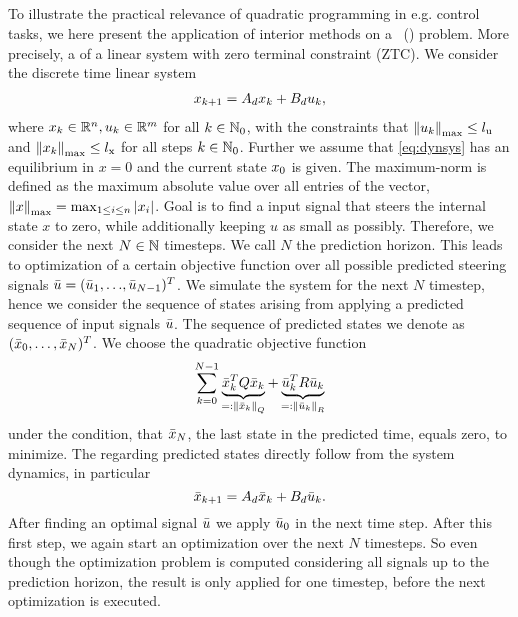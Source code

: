 \subsection{\mpclong}
To illustrate the practical relevance of quadratic programming in e.g. control tasks, we here present the application of interior methods on a \mpclong \ (\mpc) problem. More precisely, a \mpc of a linear system with zero terminal constraint (ZTC).
We consider the discrete time linear system
\begin{align}
x_{k+1} = A_d x_k + B_d u_k, \label{eq:dynsys}
\end{align}
where $ x_k \in \mathbb{R}^n, u_k \in \mathbb{R}^m $ for all $ k \in  \mathbb{N}_0$, with the constraints that $ {\left\lVert u_k\right\rVert}_{\mathrm{max}} \leq {l}_{\mathrm{u}}$
and $ {\left\lVert x_k\right\rVert}_{\mathrm{max}} \leq {l}_{\mathrm{x}} $ for all steps $ k\in \mathbb{N}_0 $. Further we assume that \eqref{eq:dynsys} has an equilibrium in $ x = 0 $ and the current state $ x_0 $ is given. The maximum-norm is defined as the maximum absolute value over all entries of the vector, ${\left\lVert x\right\rVert}_{\mathrm{max}} = \max_{1\leq i\leq n } |x_i| $.
Goal is to find a input signal that steers the internal state $ x $ to zero, while additionally keeping $ u $ as small as possibly. Therefore, we consider the next $ N \in \mathbb{N} $ timesteps. We call $ N $ the prediction horizon.
This leads to optimization of a certain objective function over all possible predicted steering signals $ \bar{u} = ({\bar{u}_1},{\dots},{\bar{u}_{N-1}})^T $. We simulate the system for the next $ N $ timestep, hence we consider the sequence of states arising from applying a predicted sequence of input signals $ \bar{u} $. The sequence of predicted states we denote as $ (\bar{x}_0,\dots,\bar{x}_N)^T $.
We choose the quadratic objective function
\begin{equation}
\sum_{k = 0}^{N-1} \underbrace{\bar{x}_k^T Q \bar{x}_k }_{=: \left\lVert\bar{x}_k\right\rVert_Q}+ \underbrace{\bar{u}_k ^T R \bar{u}_k}_{=:\left\lVert\bar{u}_k\right\rVert_R} \label{eq:mpcobjraw}
\end{equation}
under the condition, that $ \bar{x}_N $, the last state in the predicted time, equals zero,
to minimize. The regarding predicted states directly follow from the system dynamics, in particular
\[ \bar{x}_{k+1} = A_d \bar{x}_k + B_d \bar{u}_k. \] After finding an optimal signal $ \bar{u} $ we apply $ \bar{u}_0 $ in the next time step. After this first step, we again start an optimization over the next $ N $ timesteps. So even though the optimization problem is computed considering all signals up to the prediction horizon, the result is only applied for one timestep, before the next optimization is executed.

